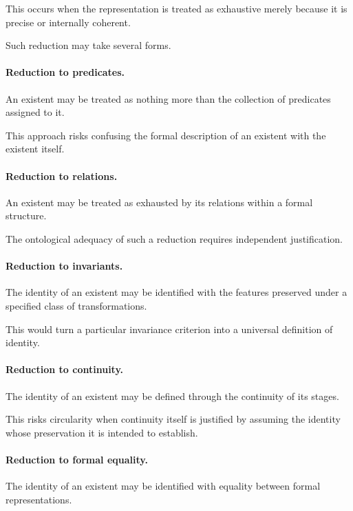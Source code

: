This occurs
when the
representation is
treated as
exhaustive merely
because it
is precise
or internally
coherent.

Such reduction
may take
several forms.

\paragraph{Reduction to predicates.}

An existent
may be treated
as nothing
more than
the collection
of predicates
assigned to it.

This approach
risks confusing
the formal
description of
an existent
with the
existent itself.

\paragraph{Reduction to relations.}

An existent
may be treated
as exhausted
by its
relations within
a formal
structure.

The ontological
adequacy of
such a
reduction requires
independent justification.

\paragraph{Reduction to invariants.}

The identity
of an existent
may be identified
with the
features preserved
under a
specified class
of transformations.

This would
turn a
particular invariance
criterion into
a universal
definition of
identity.

\paragraph{Reduction to continuity.}

The identity
of an existent
may be defined
through the
continuity of
its stages.

This risks
circularity when
continuity itself
is justified
by assuming
the identity
whose preservation
it is intended
to establish.

\paragraph{Reduction to formal equality.}

The identity
of an existent
may be identified
with equality
between formal
representations.

